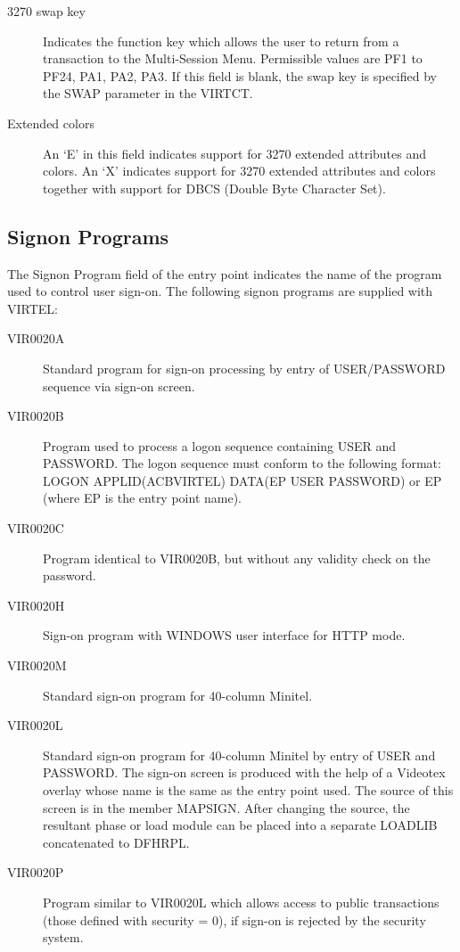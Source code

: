 \documentclass[letterpaper,10pt,english]{sphinxmanual}
\begin{document}
\begin{description}
\item[{3270 swap key}] \leavevmode
Indicates the function key which allows the user to return from a transaction to the Multi-Session Menu. Permissible values are PF1 to PF24, PA1, PA2, PA3. If this field is blank, the swap key is specified by the SWAP parameter in the VIRTCT.

\item[{Extended colors}] \leavevmode
An ‘E’ in this field indicates support for 3270 extended attributes and colors. An ‘X’ indicates support for 3270 extended attributes and colors together with support for DBCS (Double Byte Character Set).

\end{description}


\subsection{Signon Programs}
\label{\detokenize{connectivity_guide:signon-programs}}\label{\detokenize{connectivity_guide:index-110}}
The Signon Program field of the entry point indicates the name of the program used to control user sign-on. The following signon programs are supplied with VIRTEL:
\begin{description}
\item[{VIR0020A}] \leavevmode
Standard program for sign-on processing by entry of USER/PASSWORD sequence via sign-on screen.

\item[{VIR0020B}] \leavevmode
Program used to process a logon sequence containing USER and PASSWORD. The logon sequence must conform to the following format: LOGON APPLID(ACBVIRTEL) DATA(EP USER PASSWORD) or EP (where EP is the entry point name).

\item[{VIR0020C}] \leavevmode
Program identical to VIR0020B, but without any validity check on the password.

\item[{VIR0020H}] \leavevmode
Sign-on program with WINDOWS user interface for HTTP mode.

\item[{VIR0020M}] \leavevmode
Standard sign-on program for 40-column Minitel.

\item[{VIR0020L}] \leavevmode
Standard sign-on program for 40-column Minitel by entry of USER and PASSWORD. The sign-on screen is produced with the help of a Videotex overlay whose name is the same as the entry point used. The source of this screen is in the member MAPSIGN. After changing the source, the resultant phase or load module can be placed into a separate LOADLIB concatenated to DFHRPL.

\item[{VIR0020P}] \leavevmode
Program similar to VIR0020L which allows access to public transactions (those defined with security = 0), if sign-on is rejected by the security system.

\end{description}
\end{document}
